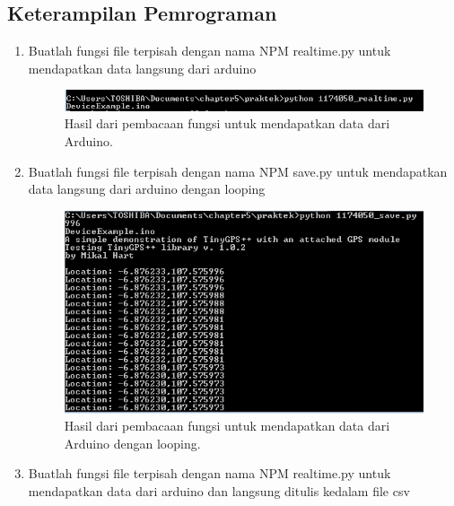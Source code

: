 \subsection{Keterampilan Pemrograman}
\begin{enumerate}
	\item Buatlah fungsi file terpisah dengan nama NPM realtime.py untuk mendapatkan data langsung dari arduino
	

	\begin{figure}[H]
		\includegraphics[width=12cm]{figures/5/1174050/Praktek/realtime.png}
		\centering
		\caption{Hasil dari pembacaan fungsi untuk mendapatkan data dari Arduino.}
	\end{figure}
	
	\item Buatlah fungsi file terpisah dengan nama NPM save.py untuk mendapatkan data langsung dari arduino dengan looping
	

	\begin{figure}[H]
		\includegraphics[width=12cm]{figures/5/1174050/Praktek/save.png}
		\centering
		\caption{Hasil dari pembacaan fungsi untuk mendapatkan data dari Arduino dengan looping.}
	\end{figure}
	
	\item Buatlah fungsi file terpisah dengan nama NPM realtime.py untuk mendapatkan data dari arduino dan langsung ditulis kedalam file csv
	


\end{enumerate}
